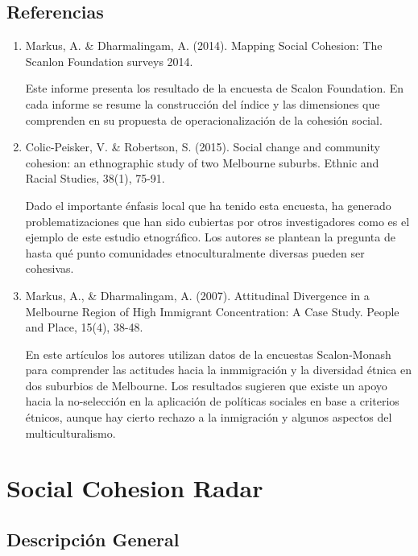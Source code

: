 \documentclass[
  12pt,
]{book}
\begin{document}
\hypertarget{referencias-1}{%
\section{Referencias}\label{referencias-1}}

\begin{enumerate}
\def\labelenumi{\arabic{enumi}.}
\item
  Markus, A. \& Dharmalingam, A. (2014). Mapping Social Cohesion: The
  Scanlon Foundation surveys 2014.

  Este informe presenta los resultado de la encuesta de Scalon Foundation. En cada informe se resume la construcción del índice y las dimensiones que comprenden en su propuesta de operacionalización de la cohesión social.
\item
  Colic-Peisker, V. \& Robertson, S. (2015). Social change and
  community cohesion: an ethnographic study of two Melbourne suburbs.
  Ethnic and Racial Studies, 38(1), 75-91.

  Dado el importante énfasis local que ha tenido esta encuesta, ha
  generado problematizaciones que han sido cubiertas por otros
  investigadores como es el ejemplo de este estudio etnográfico. Los
  autores se plantean la pregunta de hasta qué punto comunidades
  etnoculturalmente diversas pueden ser cohesivas.
\item
  Markus, A., \& Dharmalingam, A. (2007). Attitudinal Divergence in a
  Melbourne Region of High Immigrant Concentration: A Case Study.
  People and Place, 15(4), 38-48.

  En este artículos los autores utilizan datos de la encuestas
  Scalon-Monash para comprender las actitudes hacia la inmmigración y
  la diversidad étnica en dos suburbios de Melbourne. Los resultados
  sugieren que existe un apoyo hacia la no-selección en la aplicación
  de políticas sociales en base a criterios étnicos, aunque hay cierto
  rechazo a la inmigración y algunos aspectos del multiculturalismo.
\end{enumerate}

\hypertarget{social-cohesion-radar}{%
\chapter{Social Cohesion Radar}\label{social-cohesion-radar}}

\hypertarget{descripciuxf3n-general-2}{%
\section{Descripción General}\label{descripciuxf3n-general-2}}
\end{document}
